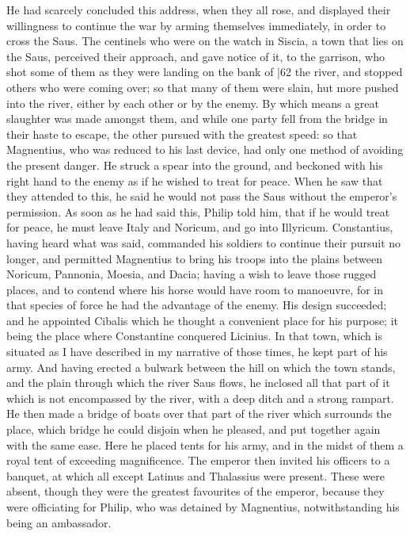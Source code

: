He had scarcely concluded this address, when they all rose, and displayed their willingness to continue the war by arming themselves immediately, in order to cross the Saus. The centinels who were on the watch in Siscia, a town that lies on the Saus, perceived their approach, and gave notice of it, to the garrison, who shot some of them as they were landing on the bank of
|62 the river, and stopped others who were coming over; so that many of them were slain, hut more pushed into the river, either by each other or by the enemy. By which means a great slaughter was made amongst them, and while one party fell from the bridge in their haste to escape, the other pursued with the greatest speed: so that Magnentius, who was reduced to his last device, had only one method of avoiding the present danger. He struck a spear into the ground, and beckoned with his right hand to the enemy as if he wished to treat for peace. When he saw that they attended to this, he said he would not pass the Saus without the emperor's permission. As soon as he had said this, Philip told him, that if he would treat for peace, he must leave Italy and Noricum, and go into Illyricum. Constantius, having heard what was said, commanded his soldiers to continue their pursuit no longer, and permitted Magnentius to bring his troops into the plains between Noricum, Pannonia, Moesia, and Dacia; having a wish to leave those rugged places, and to contend where his horse would have room to manoeuvre, for in that species of force he had the advantage of the enemy. His design succeeded; and he appointed Cibalis which he thought a convenient place for his purpose; it being the place where Constantine conquered Licinius. In that town, which is situated as I have described in my narrative of those times, he kept part of his army. And having erected a bulwark between the hill on which the town stands, and the plain through which the river Saus flows, he inclosed all that part of it which is not encompassed by the river, with a deep ditch and a strong rampart. He then made a bridge of boats over that part of the river which surrounds the place, which bridge he could disjoin when he pleased, and put together again with the same ease. Here he placed tents for his army, and in the midst of them a royal tent of exceeding magnificence. The emperor then invited his officers to a banquet, at which all except Latinus and Thalassius were present. These were absent, though they were the greatest favourites of the emperor, because they were officiating for Philip, who was detained by Magnentius, notwithstanding his being an ambassador.

